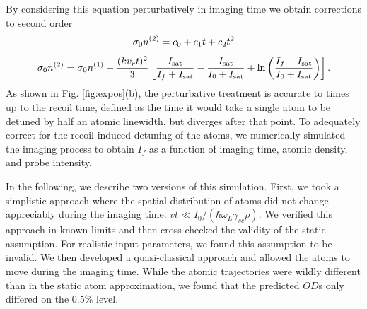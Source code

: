 \documentclass[12pt]{iopart}
\begin{document}
\par By considering this equation perturbatively in imaging time we obtain corrections to second order \cite{LJLthesis}
\begin{equation}
\sigma_0 n^{\rm{(2)}}=c_0+c_1t+c_2t^2
\end{equation}
\begin{equation}
\sigma_0 n^{\rm{(2)}}= \sigma_0 n^{\rm{(1)}}+\frac{(kv_rt)^2}{3}\left[\frac{I_{\rm{sat}}}{I_f+I_{\rm{sat}}}-\frac{I_{\rm{sat}}}{I_0+I_{\rm{sat}}}+\mathrm{ln}\left(\frac{I_f+I_{\rm{sat}}}{I_0+I_{\rm{sat}}}\right)\right].
\label{eq:OD2}
\end{equation}
As shown in  Fig. \ref{fig:expos}(b), the perturbative treatment is accurate to times up to the recoil time, defined as the time it would take a single atom to be detuned by half an atomic linewidth, but diverges after that point. To adequately correct for the recoil induced detuning of the atoms, we numerically simulated the imaging process to obtain $I_f$ as a function of imaging time, atomic density, and probe intensity.
\par In the following, we describe two versions of this simulation. First, we took a simplistic approach where the spatial distribution of atoms did not change appreciably during the imaging time: $vt\ll I_0/(\hbar \omega_L \gamma_{sc} \rho)$. We verified this approach in known limits and then cross-checked the validity of the static assumption. For realistic input parameters, we found this assumption to be invalid. We then developed a quasi-classical approach and allowed the atoms to move during the imaging time. While the atomic trajectories were wildly different than in the static atom approximation, we found that the predicted $OD$s only differed on the 0.5$\%$ level.
\end{document}
